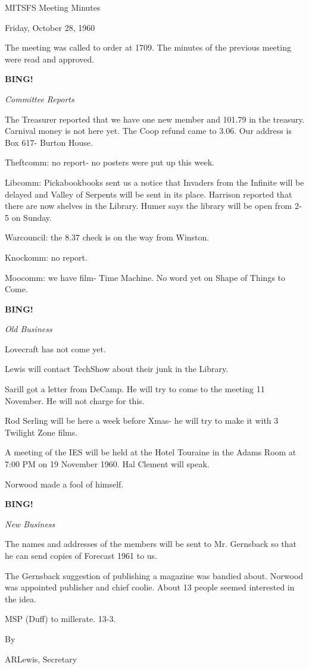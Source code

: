 \documentclass[12pt]{article}
\newcommand{\bing}{{\bf BING!} }
\newcommand{\goto}[1]{\bing \vskip 12pt \centerline{{\em{#1}}}}
\begin{document}
\begin{center}

MITSFS Meeting Minutes

Friday, October 28, 1960

\end{center}
 
\vspace{12pt}

\setlength{\parskip}{6pt}

\noindent
The meeting was called to order at 1709. The minutes of the previous meeting were read and approved.

\goto{Committee Reports}

The Treasurer reported that we have one new member and 101.79 in the treasury. Carnival money is not here yet. The Coop refund came to 3.06. Our address is Box 617- Burton House.

Theftcomm: no report- no posters were put up this week.

Libcomm: Pickabookbooks sent us a notice that Invaders from the Infinite will be delayed and Valley of Serpents will be sent in its place. Harrison reported that there are now shelves in the Library. Humer says the library will be open from 2-5 on Sunday.

Warcouncil: the 8.37 check is on the way from Winston.

Knockomm: no report.

Moocomm: we have film- Time Machine. No word yet on Shape of Things to Come.

\goto{Old Business}

Lovecraft has not come yet.

Lewis will contact TechShow about their junk in the Library.

Sarill got a letter from DeCamp. He will try to come to the meeting 11 November. He will not charge for this.

Rod Serling will be here a week before Xmas- he will try to make it with 3 Twilight Zone films.

A meeting of the IES will be held at the Hotel Touraine in the Adams Room at 7:00 PM on 19 November 1960. Hal Clement will speak.

Norwood made a fool of himself.

\goto{New Business}

The names and addresses of the members will be sent to Mr. Gernsback so that he can send copies of Forecast 1961 to us.

The Gernsback suggestion of publishing a magazine was bandied about. Norwood was appointed publisher and chief coolie. About 13 people seemed interested in the idea.

MSP (Duff) to millerate. 13-3.

\vspace{12pt}

\centerline{By}
\centerline{ARLewis, Secretary}
\end{document}
